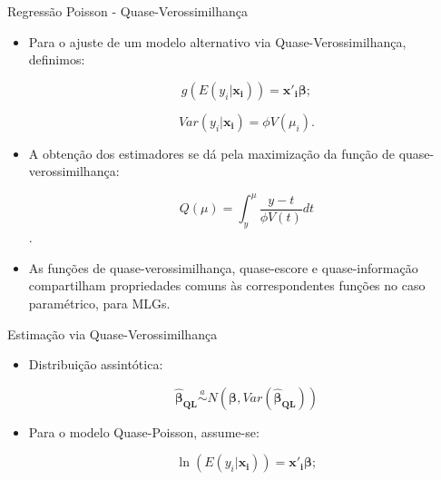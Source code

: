 \documentclass[10pt, aspectratio=169]{beamer}
\begin{document}
\begin{frame}{Regressão Poisson - Quase-Verossimilhança} 

\begin{itemize}
    \item Para o ajuste de um modelo alternativo via Quase-Verossimilhança, definimos:

\vspace{0.4cm}

$$g(E(y_i|\boldsymbol{x_i}))=\boldsymbol{x'_i \beta};$$

$$Var(y_i|\boldsymbol{x_i})=\phi V(\mu_i).$$

\item A obtenção dos estimadores se dá pela maximização da função de quase-verossimilhança:

$$ Q\left ( \mu \right )=\int _y^\mu \frac{y-t}{\phi V(t)}dt $$.


\item As funções de quase-verossimilhança, quase-escore e quase-informação compartilham propriedades comuns às correspondentes funções no caso paramétrico, para MLGs.

\end{itemize}



\end{frame}







\begin{frame}{Estimação via Quase-Verossimilhança} 

\begin{itemize}

\item Distribuição assintótica:

\vspace{0.3cm}

$$ \boldsymbol{\hat{\beta}_{QL}} \overset{a}{\sim} N(\boldsymbol{\beta}, Var(\boldsymbol{\hat{\beta}_{QL}} ))$$

\vspace{0.8cm}

\item Para o modelo Quase-Poisson, assume-se:

$$\ln(E(y_i|\boldsymbol{x_i}))=\boldsymbol{x'_i \beta};$$





\end{itemize}

\end{frame}
\end{document}
